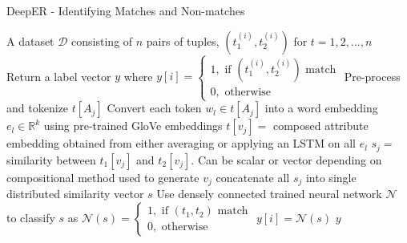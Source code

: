 \documentclass{article}
\begin{document}
\begin{algorithm}
	\caption{DeepER - Identifying Matches and Non-matches}
	\begin{algorithmic}[1]
		\REQUIRE A dataset $\mathcal{D}$ consisting of $n$ pairs of tuples, $(t_{1}^{(i)}, t_{2}^{(i)})$ for $ t = 1, 2, ..., n$
		\ENSURE Return a label vector $y$ where $y[i] = \begin{cases} 1, \text{   if } (t_{1}^{(i)}, t_{2}^{(i)}) \text{ match} \\ 0, \text{   otherwise} \end{cases}$
				\STATE Pre-process and tokenize $t[A_j]$
				\STATE Convert each token $w_l \in t[A_j]$ into a word embedding $e_l \in \mathbb{R}^k$ using pre-trained GloVe embeddings
				\STATE $t[v_j] = $ composed attribute embedding obtained from either averaging or applying an LSTM on all $e_l$ 
			\ENDFOR
		\ENDFOR
				\STATE $s_j = $ similarity between $t_1[v_j]$ and $t_2[v_j]$. Can be scalar or vector depending on compositional method used to generate $v_j$
			\ENDFOR
			\STATE concatenate all $s_j$ into single distributed similarity vector $s$
			\STATE Use densely connected trained neural network $\mathcal{N}$ to classify $s$ as $\mathcal{N}(s) = \begin{cases} 1, \text{   if } (t_{1}, t_{2}) \text{ match} \\ 0, \text{   otherwise} \end{cases}$
			\STATE $y[i] = \mathcal{N}(s)$
		\ENDFOR
		\RETURN $y$
	\end{algorithmic}
\end{algorithm}
\end{document}
